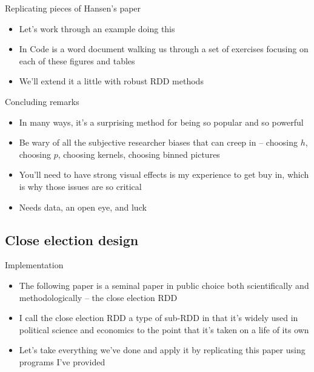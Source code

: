 \documentclass{beamer}
\begin{document}
\begin{frame}{Replicating pieces of Hansen's paper}

\begin{itemize}
\item Let's work through an example doing this
\item In Code is a word document walking us through a set of exercises focusing on each of these figures and tables
\item We'll extend it a little with robust RDD methods
\end{itemize}

\end{frame}


\begin{frame}{Concluding remarks}

\begin{itemize}
\item In many ways, it's a surprising method for being so popular and so powerful
\item Be wary of all the subjective researcher biases that can creep in -- choosing $h$, choosing $p$, choosing kernels, choosing binned pictures
\item You'll need to have strong visual effects is my experience to get buy in, which is why those issues are so critical
\item Needs data, an open eye, and luck
\end{itemize}

\end{frame}



\subsection{Close election design}



		
\begin{frame}{Implementation}

\begin{itemize}
\item The following paper is a seminal paper in public choice both scientifically and methodologically -- the close election RDD
\item I call the close election RDD a type of sub-RDD in that it's widely used in political science and economics to the point that it's taken on a life of its own
\item Let's take everything we've done and apply it by replicating this paper using programs I've provided
\end{itemize}

\end{frame}
\end{document}
